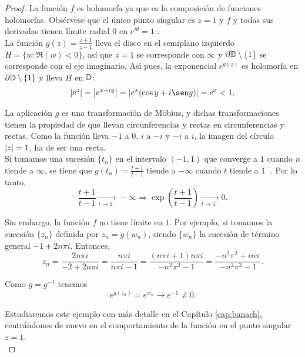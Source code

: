 \begin{proof}
    La función $f$ es holomorfa ya que es la composición de funciones holomorfas. Obsérvese que el único punto singular es $z = 1$ y $f$ y todas sus derivadas tienen límite radial 0 en $e^{i \theta} = 1$ . \\

    La función $g(z) = \frac{z + 1}{z - 1}$ lleva el disco en el semiplano izquierdo $H = \{w: \Re (w) < 0\}$, así que $z = 1$ se corresponde con $\infty$ y $\partial \mathbb{D} \setminus \{1\}$ se corresponde con el eje imaginario. Así pues, la exponencial $e^{g(z)}$ es holomorfa en $\partial \mathbb{D} \setminus \{1\}$ y lleva $H$ en $\mathbb{D}$:
    \begin{equation*}
        \abs{e^z} = \abs{e^{x+iy}} = \abs{e^{x}(\cos y + i\sen y)} = e^{x} < 1.
    \end{equation*}

    La aplicación $g$ es una transformación de Möbius, y dichas transformaciones tienen la propiedad de que llevan circunferencias y rectas en circunferencias y rectas. Como la función lleva $-1$ a $0$, $i$ a $-i$ y $-i$ a $i$, la imagen del círculo $\left\lvert z\right\rvert=1$, ha de ser una recta. \\

    Si tomamos una sucesión $\{t_n\}$ en el intervalo $(-1,1)$ que converge a $1$ cuando $n$ tiende a $\infty$, se tiene que $g(t_n)  = \frac{t + 1}{t - 1}$ tiende a $- \infty$ cuando $t$ tiende a $1^-$. Por lo tanto,
    \begin{equation*}
        \frac{t + 1}{t - 1} \xrightarrow[t \to 1^-]{}  - \infty \Rightarrow \exp \left(  \frac{t + 1}{t - 1} \right) \xrightarrow[t \to 1^-]{} 0.
    \end{equation*}

    Sin embargo, la función $f$ no tiene límite en $1$. Por ejemplo, si tomamos la sucesión $\{z_n\}$ definida por $z_n = g(w_n)$, siendo $\{w_n\}$ la sucesión de término general $-1 + 2n \pi i$. Entonces,
     \begin{equation*}
         z_n = \frac{2n \pi i}{-2 + 2n \pi i} = \frac{n \pi i}{n \pi i - 1} =  \frac{(n \pi i + 1) n \pi i}{- n^2 \pi^2 - 1} = \frac{-n^2 \pi^2 + i n \pi}{-n^2 \pi^2 - 1}.
     \end{equation*}

     Como $g = g^{-1}$ tenemos
     \begin{equation*}
         e^{g(z_n)} = e^{w_n} \to e^{-1} \not = 0.
     \end{equation*}

     Estudiaremos este ejemplo con más detalle en el Capítulo \ref{cap:banach}, centrándonos de nuevo en el comportamiento de la función en el punto singular $z = 1$. \\
 \end{proof}


